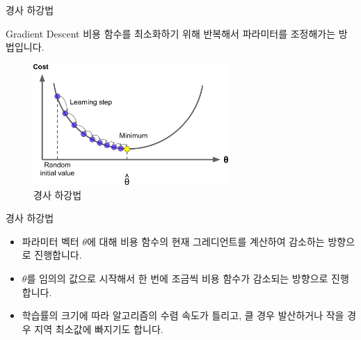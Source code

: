 \documentclass{beamer}
\numberwithin{equation}{section}
\begin{document}

\begin{frame}{경사 하강법}

\begin{block}{Gradient Descent}
비용 함수를 최소화하기 위해 반복해서 파라미터를 조정해가는 방법입니다.
\end{block}

\vskip 0.5cm

\begin{figure}
\includegraphics[width=20em]{./images/gradient_descent}
\caption{\label{fig:gradient_descent}경사 하강법}
\end{figure}

\end{frame}


\begin{frame}{경사 하강법}

\begin{itemize}
\item 파라미터 벡터 $\theta$에 대해 비용 함수의 현재 그레디언트를 계산하여 감소하는 방향으로 진행합니다.
\vskip 0.25cm
\item $\theta$를 임의의 값으로 시작해서 한 번에 조금씩 비용 함수가 감소되는 방향으로 진행합니다.
\vskip 0.25cm
\item 학습률의 크기에 따라 알고리즘의 수렴 속도가 틀리고, 클 경우 발산하거나 작을 경우 지역 최소값에 빠지기도 합니다.
\end{itemize}

\end{frame}

\end{document}
